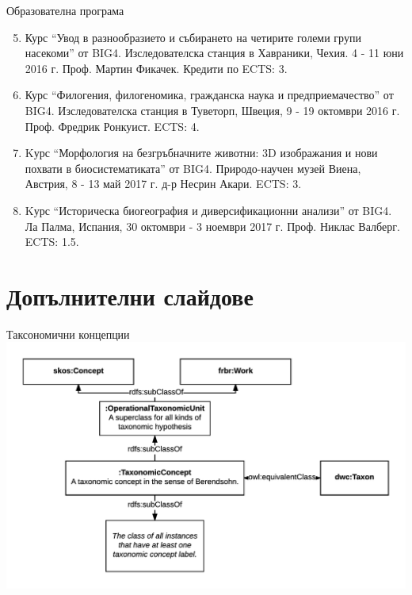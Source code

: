 \documentclass[bulgarian]{beamer}
\begin{document}
\begin{frame}{Образователна програма}

\begin{enumerate}
    \setcounter{enumi}{4}
    \item Курс ``Увод в разнообразието и събирането на четирите големи групи насекоми'' от BIG4. Изследователска станция в Хавраники, Чехия. 4 - 11 юни 2016 г. Проф. Мартин Фикачек. Кредити по ECTS: 3.
    \item Курс ``Филогения, филогеномика, гражданска наука и предприемачество'' от BIG4. Изследователска станция в Туветорп, Швеция, 9 - 19 октомври 2016 г. Проф. Фредрик Ронкуист. ECTS: 4.
    \item Kурс ``Морфология на безгръбначните животни: 3D изображания и нови похвати в биосистематиката'' от BIG4. Природо-научен музей Виена, Австрия, 8 - 13 май 2017 г. д-р Несрин Акари. ECTS: 3.
    \item Kурс ``Историческа биогеография и диверсификационни анализи'' от BIG4. Ла Палма, Испания, 30 октомври - 3 ноември 2017 г. Проф. Никлас Валберг. ECTS: 1.5.

 

\end{enumerate}

\end{frame}

{

}



\section{Допълнителни слайдове}

\begin{frame}{Таксономични концепции}
\centering
  \includegraphics[width=\textwidth]{Figures/taxonomic-concept-diagram}
  \decoRule
  
\end{frame}
\end{document}
